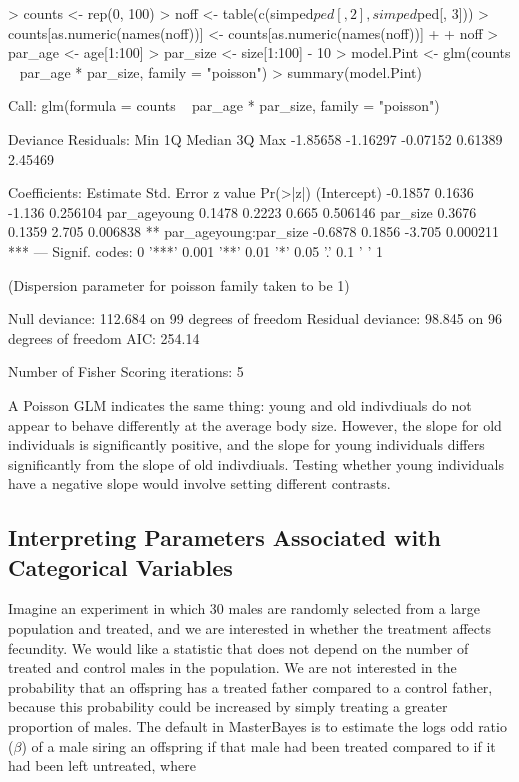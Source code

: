 \documentclass{article}
\begin{document}
\begin{Schunk}
\begin{Sinput}
> counts <- rep(0, 100)
> noff <- table(c(simped$ped[, 2], simped$ped[, 3]))
> counts[as.numeric(names(noff))] <- counts[as.numeric(names(noff))] + 
+     noff
> par_age <- age[1:100]
> par_size <- size[1:100] - 10
> model.Pint <- glm(counts ~ par_age * par_size, family = "poisson")
> summary(model.Pint)
\end{Sinput}
\begin{Soutput}
Call:
glm(formula = counts ~ par_age * par_size, family = "poisson")

Deviance Residuals: 
     Min        1Q    Median        3Q       Max  
-1.85658  -1.16297  -0.07152   0.61389   2.45469  

Coefficients:
                      Estimate Std. Error z value Pr(>|z|)    
(Intercept)            -0.1857     0.1636  -1.136 0.256104    
par_ageyoung            0.1478     0.2223   0.665 0.506146    
par_size                0.3676     0.1359   2.705 0.006838 ** 
par_ageyoung:par_size  -0.6878     0.1856  -3.705 0.000211 ***
---
Signif. codes:  0 '***' 0.001 '**' 0.01 '*' 0.05 '.' 0.1 ' ' 1 

(Dispersion parameter for poisson family taken to be 1)

    Null deviance: 112.684  on 99  degrees of freedom
Residual deviance:  98.845  on 96  degrees of freedom
AIC: 254.14

Number of Fisher Scoring iterations: 5
\end{Soutput}
\end{Schunk}

A Poisson GLM indicates the same thing: young and old indivdiuals do not appear to behave differently at the average body size.  However, the slope for old individuals is significantly positive, and the slope for young individuals differs significantly from the slope of old indivdiuals. Testing whether young individuals have a negative slope would involve setting different contrasts. 

\subsection{Interpreting Parameters Associated with Categorical Variables}

Imagine an experiment in which 30 males are randomly selected from a large population and treated, and we are interested in whether the treatment affects fecundity.  We would like a statistic that does not depend on the number of treated and control males in the population.  We are not interested in the probability that an offspring has a treated father compared to a control father, because this probability could be increased by simply treating a greater proportion of males.  The default in MasterBayes is to estimate the logs odd ratio ($\beta$) of a male siring an offspring if that male had been treated compared to if it had been left untreated, where
\end{document}
